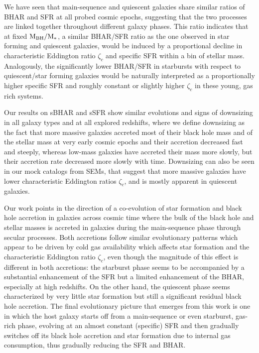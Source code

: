 We have seen that main-sequence and quiescent galaxies share similar ratios of BHAR and SFR at all probed cosmic epochs, suggesting that the two processes are linked together throughout different galaxy phases. This ratio indicates that at fixed ${\rm M}_{\rm BH}/{\rm M}_*$, a similar BHAR/SFR ratio as the one observed in star forming and quiescent galaxies, would be induced by a proportional decline in characteristic Eddington ratio $\zeta_c$ and specific SFR within a bin of stellar mass. Analogously, the significantly lower BHAR/SFR in starbursts with respect to quiescent/star forming galaxies would be naturally interpreted as a proportionally higher specific SFR and roughly constant or slightly higher $\zeta_c$ in these young, gas rich systems.

Our results on sBHAR and sSFR show similar evolutions and signs of downsizing in all galaxy types and at all explored redshifts, where we define downsizing as the fact that more massive galaxies accreted most of their black hole mass and of the stellar mass at very early cosmic epochs and their accretion decreased fast and steeply, whereas low-mass galaxies have accreted their mass more slowly, but their accretion rate decreased more slowly with time. Downsizing can also be seen in our mock catalogs from SEMs, that suggest that more massive galaxies have lower characteristic Eddington ratios $\zeta_c$, and is mostly apparent in quiescent galaxies.

Our work points in the direction of a co-evolution of star formation and black hole accretion in galaxies across cosmic time where the bulk of the black hole and stellar masses is accreted in galaxies during the main-sequence phase through secular processes.
Both accretions follow similar evolutionary patterns which appear to be driven by cold gas availability which affects star formation and the characteristic Eddington ratio $\zeta_c$, even though the magnitude of this effect is different in both accretions: the starburst phase seems to be accompanied by a substantial enhancement of the SFR but a limited enhancement of the BHAR, especially at high redshifts. On the other hand, the quiescent phase seems characterized by very little star formation but still a significant residual black hole accretion. The final evolutionary picture that emerges from this work is one in which the host galaxy starts off from a main-sequence or even starburst, gas-rich phase, evolving at an almost constant (specific) SFR and then gradually switches off its black hole accretion and star formation due to internal gas consumption, thus gradually reducing the SFR and BHAR.

